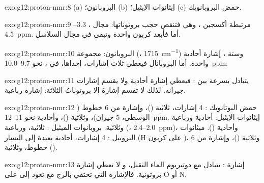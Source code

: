 \begin{solution}{exo:g12:proton-nmr:8}
(a) البروبانون؛ (b) إيثانوات الإيثيل؛ (c) حمض البروبانويك.
\end{solution}

\begin{solution}{exo:g12:proton-nmr:9}
 مرتبطة  أكسجين ، وهي
 فتنقص حجب بروتوناتها: مجال ،
3.3--\qty{4.5}{ppm}. أما  فأبعد  كربون واحدة وتبقى في
مجال السلاسل.
\end{solution}

\begin{solution}{exo:g12:proton-nmr:10}
البروبانون: مجموعة  (، \qty{1715}{cm^{-1}}) وستة ، إشارة أحادية واحدة. أما البروبانال فيعطي ثلاث إشارات، إحداها،
  في ، نحو 9.7--\qty{10.0}{ppm}.
\end{solution}

\begin{solution}{exo:g12:proton-nmr:11}
  يتبادل بسرعة بين : فيعطي إشارة
أحادية ولا يقسم إشارات جيرانه. لذلك لا تقسم إشارةَ 
إلا بروتوناتُ  الثلاثة: إشارة رباعية.
\end{solution}

\begin{solution}{exo:g12:proton-nmr:12}
حمض البوتانويك : 4 إشارات، ثلاثية ()،
وإشارة من 6 خطوط ( الوسطى، 5 جيران)، وثلاثية
()، وأحادية نحو 11--\qty{12}{ppm}. إيثانوات الإيثيل: أحادية
ورباعية وثلاثية. بروبانوات الميثيل :
ثلاثية، ورباعية (، 2.0--\qty{2.4}{ppm})، وأحادية
(). ميثانوات البروبيل : 4 إشارات،
أحادية بعيدة إلى اليسار (H على كربون )، وثلاثية
()، وإشارة من 6 خطوط، وثلاثية ().
\end{solution}

\begin{solution}{exo:g12:proton-nmr:13}
إشارة :   تتبادل مع دوتيريوم
الماء الثقيل، و لا تعطي إشارة بروتونية. فالإشارة التي
تختفي بالرج مع  تعود إلى  على O أو N.
\end{solution}


